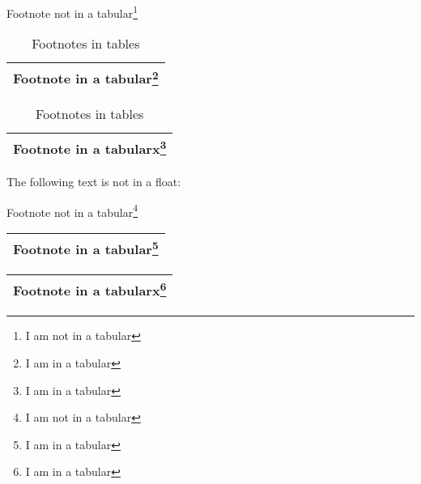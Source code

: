 \begin{table}
  Footnote not in a tabular\footnote{I am not in a tabular}

  \begin{tabular}{|l|}
  \hline
    Footnote  in a tabular\footnote{I am in a tabular}\\
  \hline
  \end{tabular}

  \begin{tabularx}{\textwidth}{|l|}
  \hline
    Footnote  in a tabularx\footnote{I am in a tabular}\\
  \hline
  \end{tabularx}
  \caption{Footnotes in tables}
\end{table}

The following text is not in a float:

  Footnote not in a tabular\footnote{I am not in a tabular}

  \begin{tabular}{|l|}
  \hline
    Footnote  in a tabular\footnote{I am in a tabular}\\
  \hline
  \end{tabular}

  \begin{tabularx}{\textwidth}{|l|}
  \hline
    Footnote  in a tabularx\footnote{I am in a tabular}\\
  \hline
  \end{tabularx}
